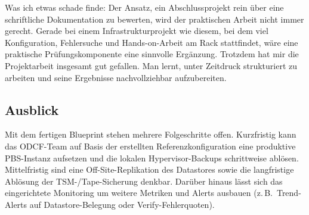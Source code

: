 Was ich etwas schade finde: Der Ansatz, ein Abschlussprojekt rein
über eine schriftliche Dokumentation zu bewerten, wird der
praktischen Arbeit nicht immer gerecht. Gerade bei einem
Infrastrukturprojekt wie diesem, bei dem viel Konfiguration,
Fehlersuche und Hands-on-Arbeit am Rack stattfindet, wäre eine
praktische Prüfungskomponente eine sinnvolle Ergänzung. Trotzdem
hat mir die Projektarbeit insgesamt gut gefallen. Man lernt,
unter Zeitdruck strukturiert zu arbeiten und seine Ergebnisse
nachvollziehbar aufzubereiten.

\subsection{Ausblick}
\label{sec:Ausblick}

Mit dem fertigen Blueprint stehen mehrere Folgeschritte offen.
Kurzfristig kann das \ac{ODCF}-Team auf Basis der erstellten
Referenzkonfiguration eine produktive \ac{PBS}-Instanz aufsetzen
und die lokalen Hypervisor-Backups schrittweise ablösen.
Mittelfristig sind eine Off-Site-Replikation des Datastores sowie
die langfristige Ablösung der \ac{TSM}-/Tape-Sicherung denkbar.
Darüber hinaus lässt sich das eingerichtete Monitoring um weitere
Metriken und Alerts ausbauen (z.\,B.\ Trend-Alerts auf
Datastore-Belegung oder Verify-Fehlerquoten).
